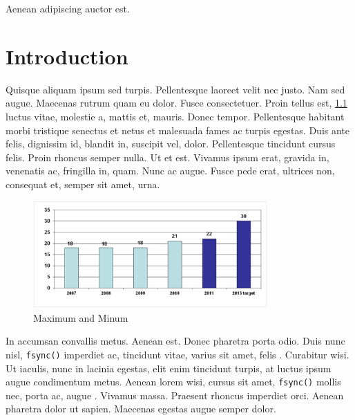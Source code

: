 \begin{savequote}[90mm]
  {\QuoteFont Aenean adipiscing auctor est.} 
\end{savequote}

\chapter{Introduction}
\label{sec:introduction}


Quisque aliquam ipsum sed turpis.
Pellentesque laoreet velit nec justo. Nam sed augue. Maecenas rutrum
quam eu dolor. Fusce consectetuer. Proin tellus est, \ref{fig:intro:sustainedBW} luctus vitae,
molestie a, mattis et, mauris. Donec tempor. Pellentesque habitant
morbi tristique senectus et netus et malesuada fames ac turpis
egestas. Duis ante felis, dignissim id, blandit in, suscipit vel,
dolor. Pellentesque tincidunt cursus felis. Proin rhoncus semper
nulla. Ut et est. Vivamus ipsum erat, gravida in, venenatis ac,
fringilla in, quam. Nunc ac augue. Fusce pede erat, ultrices non,
consequat et, semper sit amet, urna.


\begin{figure}[tbp]
\centering
\includegraphics[width=0.8\textwidth]{./figures/chapter_00/figure1}
\caption{Maximum and Minum } \label{fig:intro:sustainedBW}
\end{figure}

In accumsan convallis metus. Aenean est. Donec
pharetra porta odio. Duis nunc nisl, \texttt{fsync()} imperdiet ac, tincidunt vitae,
varius sit amet, felis \cite{lee2012smart,jeong_smartphone_atc13}. Curabitur wisi. Ut iaculis, nunc in lacinia
egestas, elit enim tincidunt turpis, at luctus ipsum augue
condimentum metus. Aenean lorem wisi, cursus sit amet, \texttt{fsync()} mollis nec,
porta ac, augue \cite{grancher2010oracle,kivity2007kvm,DingdingLi_virtualized_2013}. Vivamus massa. Praesent rhoncus imperdiet orci.
Aenean pharetra dolor ut sapien. Maecenas egestas augue semper
dolor.



